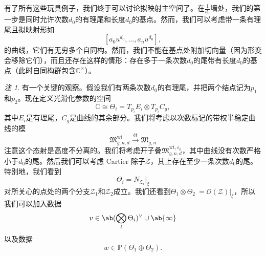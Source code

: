 \documentclass{amsart}
\theoremstyle{definition}
\theoremstyle{remark}
\newtheorem{rmk}[thm]{注}
\theoremstyle{plain}
\theoremstyle{definition}
\theoremstyle{remark}
\newcommand{\C}{\mathbb{C}}
\renewcommand{\P}{\mathbb{P}}
\newcommand{\ep}{\varepsilon}
\newcommand{\mc}[1]{\mathcal{#1}}
\newcommand{\mf}[1]{\mathfrak{#1}}
\newcommand{\mr}[1]{\mathrm{#1}}
\newcommand{\1}{\mathbf{1}}
\newcommand{\2}{\mathbf{2}}
\newcommand{\3}{\mathbf{3}}
\begin{document}
有了所有这些玩具例子，我们终于可以讨论拟映射主空间了。在\(\frac{1}{d_0}\)墙处，我们的第一步是同时允许次数\(d_0\)的有理尾和长度\(d_0\)的基点。然而，我们可以考虑带一条有理尾且拟映射形如
\[ [a_0 u^{d_0}, \ldots, a_n u^{d_0}], \]
的曲线，它们有无穷多个自同构。然而，我们不能在基点处附加切向量（因为形变会移除它们），而且还存在这样的情形：存在多于一条次数\(d_0\)的尾带有长度\(d_0\)的基点（此时自同构群包含\(\C^{\times}\)）。

\begin{rmk}
    有一个关键的观察。假设我们有两条次数\(d_0\)的有理尾，并把两个结点记为\(p_1\)和\(p_2\)。现在定义光滑化参数的空间
    \[ \C \cong \Theta_i = T_{p_i} E_i \otimes T_{p_i} C_g, \]
    其中\(E_i\)是有理尾，\(C_g\)是曲线的其余部分。我们将考虑以次数标记的带权半稳定曲线的模
    \[ \mf{M}_{g,n,d}^{\mr{wt}} \xrightarrow{\text{\'et}} \mf{M}_{g,n} \]
    注意这个态射是高度不分离的。我们将考虑开子叠\(\mf{M}_{g,n,d}^{\mr{wt}, \ep_0}\)，其中曲线没有次数严格小于\(d_0\)的尾。然后我们可以考虑 Cartier 除子\(\mc{Z}\)，其上存在至少一条次数\(d_0\)的尾。特别地，我们看到
    \[ \Theta_i = N_{\mc{Z}_i} |_{\xi} \]
    对所关心的点处的两个分支\(\mc{Z}_1\)和\(\mc{Z}_2\)成立。我们还看到\(\Theta_1 \otimes \Theta_2\ = \mc{O}(\mc{Z})|_{\xi}\)，所以我们可以加入数据
    \[ v \in \ab(\bigotimes_i \Theta_i)^{\vee} \cup \ab\{\infty\} \]
    以及数据
    \[ w \in \P(\Theta_1 \oplus\Theta_2). \]
\end{rmk}
\end{document}
